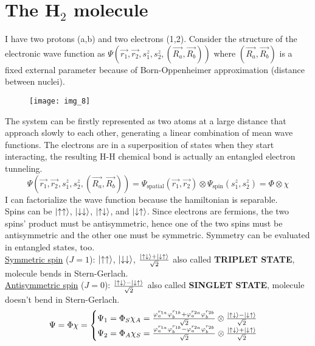 \section{The H$_2$ molecule}
I have two protons (a,b) and two electrons (1,2). Consider the structure of the electronic wave function as $\Psi(\vec{r_1},\vec{r_2},s_1^z,s_2^z,(\vec{R_a},\vec{R_b}))$ where $(\vec{R_a},\vec{R_b})$ is a fixed external parameter because of Born-Oppenheimer approximation (distance between nuclei).\\
\begin{figure}[htbp!]
	\centering
	\texttt{[image: img\_8]}
\end{figure}
\newline
The system can be firstly represented as two atoms at a large distance that approach slowly to each other, generating a linear combination of mean wave functions. The electrons are in a superposition of states when they start interacting, the resulting H-H chemical bond is actually an entangled electron tunneling.
\[
\Psi(\vec{r_1},\vec{r_2},s_1^z,s_2^z,(\vec{R_a},\vec{R_b}))=\Psi_{\text{spatial}}(\vec{r_1},\vec{r_2})\otimes\Psi_{\text{spin}}(s_1^z,s_2^z)=\Phi\otimes\chi
\]
I can factorialize the wave function because the hamiltonian is separable.\\
Spins can be $\ket{\uparrow\uparrow}$, $\ket{\downarrow\downarrow}$, $\ket{\uparrow\downarrow}$, and $\ket{\downarrow\uparrow}$. Since electrons are fermions, the two spins' product must be antisymmetric, hence one of the two spins must be antisymmetric and the other one must be symmetric. Symmetry can be evaluated in entangled states, too. \\
\newline
\underline{Symmetric spin} ($J=1$): $\ket{\uparrow\uparrow}$, $\ket{\downarrow\downarrow}$, $\frac{\ket{\uparrow\downarrow}+\ket{\downarrow\uparrow}}{\sqrt{2}}$ also called \textbf{TRIPLET STATE}, molecule bends in Stern-Gerlach.\\
\newline
\underline{Antisymmetric spin} ($J=0$): $\frac{\ket{\uparrow\downarrow}-\ket{\downarrow\uparrow}}{\sqrt{2}}$ also called \textbf{SINGLET STATE}, molecule doesn't bend in Stern-Gerlach.\\
\[
\Psi=\Phi\chi=\begin{cases}
\Psi_1=\Phi_S\chi_A=\frac{\varphi_a^{r_{1a}}\varphi_b^{r_{1b}}+\varphi_a^{r_{2a}}\varphi_b^{r_{2b}}}{\sqrt{2}}\otimes\frac{\ket{\uparrow\downarrow}-\ket{\downarrow\uparrow}}{\sqrt{2}}\\
\Psi_2=\Phi_A\chi_S=\frac{\varphi_a^{r_{1a}}\varphi_b^{r_{1b}}-\varphi_a^{r_{2a}}\varphi_b^{r_{2b}}}{\sqrt{2}}\otimes\frac{\ket{\uparrow\downarrow}+\ket{\downarrow\uparrow}}{\sqrt{2}}\\
\end{cases}
\]
